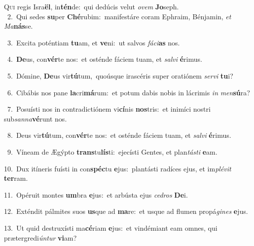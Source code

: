 \lettrine{\initial\textcolor{\initialcolor}{Q}}{ui} regis Isra\-\textbf{ël}\-, in\-\textbf{tén}\-de:~\star qui dedúcis velut \textit{o}\-\textit{vem} \textbf{Jo}\-seph.\\
{\numbfont\textcolor{\numbcolor}{~2.}}~Qui sedes \textbf{su}\-per \textbf{Ché}\-rubim:~\star manifestáre coram Ephraim, Bénjamin, \textit{et} \textit{Ma}\-\textbf{nás}se.\par
{\numbfont\textcolor{\numbcolor}{~3.}}~Excita poténtiam \textbf{tu}\-am, et \textbf{ve}\-ni:~\star ut salvos \textit{fá}\-\textit{ci}\textbf{as} nos.\par
{\numbfont\textcolor{\numbcolor}{~4.}}~\-\textbf{De}\-us, con\-\textbf{vér}\-te nos:~\star et osténde fáciem tuam, et \textit{sal}\-\textit{vi} \textbf{é}\-rimus.\par
{\numbfont\textcolor{\numbcolor}{~5.}}~Dómine, \textbf{De}\-us vir\-\textbf{tú}\-tum,~\star quoúsque irascéris super oratiónem \textit{ser}\-\textit{vi} \textbf{tu}\-i?\par
{\numbfont\textcolor{\numbcolor}{~6.}}~Cibábis nos pane \textbf{la}\-cri\-\textbf{má}\-rum:~\star et potum dabis nobis in lácrimis \textit{in} \textit{men}\-\textbf{sú}ra?\par
{\numbfont\textcolor{\numbcolor}{~7.}}~Posuísti nos in contradictiónem vi\-\textbf{cí}\-nis \textbf{nos}\-tris:~\star et inimíci nostri sub\-\textit{san}\-\textit{na}\textbf{vé}runt nos.\par
{\numbfont\textcolor{\numbcolor}{~8.}}~Deus vir\-\textbf{tú}\-tum, con\-\textbf{vér}\-te nos:~\star et osténde fáciem tuam, et \textit{sal}\-\textit{vi} \textbf{é}\-rimus.\par
{\numbfont\textcolor{\numbcolor}{~9.}}~Víneam de Ægýpto \textbf{trans}\-tu\-\textbf{lís}\-ti:~\star ejecísti Gentes, et plan\-\textit{tás}\-\textit{ti} \textbf{e}\-am.\par
{\numbfont\textcolor{\numbcolor}{10.}}~Dux itíneris fuísti in con\-\textbf{spéc}\-tu \textbf{e}\-jus:~\star plantásti radíces ejus, et im\-\textit{plé}\-\textit{vit} \textbf{ter}\-ram.\par
{\numbfont\textcolor{\numbcolor}{11.}}~Opéruit montes \textbf{um}\-bra \textbf{e}\-jus:~\star et arbústa ejus \textit{ce}\-\textit{dros} \textbf{De}\-i.\par
{\numbfont\textcolor{\numbcolor}{12.}}~Exténdit pálmites suos \textbf{us}\-que ad \textbf{ma}\-re:~\star et usque ad flumen propá\-\textit{gi}\-\textit{nes} \textbf{e}\-jus.\par
{\numbfont\textcolor{\numbcolor}{13.}}~Ut quid destruxísti ma\-\textbf{cé}\-riam \textbf{e}\-jus:~\star et vindémiant eam omnes, qui prætergredi\-\textit{ún}\-\textit{tur} \textbf{vi}\-am?\par
